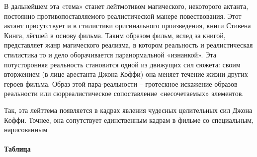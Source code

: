 В дальнейшем эта «тема» станет лейтмотивом магического, некоторого актанта, постоянно противопоставляемого реалистической манере повествования.
Этот актант присутствует и в стилистики оригинального произведения, книги Стивена Кинга, лёгшей в основу фильма.
Таким образом фильм, вслед за книгой, представляет жанр магического реализма, в котором реальность и реалистическая стилистика то и дело оборачивается паранормальной «изнанкой».
Эта потусторонняя реальность становится одной из движущих сил сюжета: своим вторжением (в лице арестанта Джона Коффи) она меняет течение жизни других героев фильма.
Образ этой пара-реальности -- гротескное искажение образов реальности или сюрреалистическое сопоставление «несочетаемых» элементов.

Так, эта лейттема появляется в кадрах явления чудесных целительных сил Джона Коффи.
Точнее, она сопутствует единственным кадрам в фильме со специальным, нарисованным

\paragraph{Таблица}\label{ux442ux430ux431ux43bux438ux446ux430}

